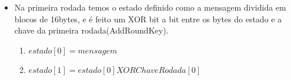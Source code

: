 \documentclass{article}
\begin{document}
\begin{itemize}


\item Na primeira rodada temos o estado definido como a mensagem dividida em blocos de 16bytes, e é feito um XOR bit a bit entre os bytes do estado e a chave da primeira rodada(AddRoundKey).
    \begin{enumerate}
        \item $estado[0] = mensagem$
        \item $estado[1] = estado[0] XOR ChaveRodada[0]$
    \end{enumerate}




\end{itemize}
\end{document}
